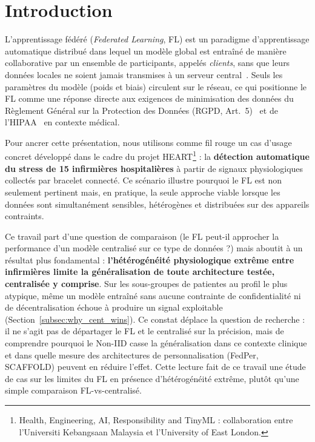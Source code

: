 \documentclass{article}
\begin{document}

\maketitle

\section{Introduction}

L'apprentissage fédéré (\textit{Federated Learning}, FL) est un paradigme
d'apprentissage automatique distribué dans lequel un modèle global est entraîné de
manière collaborative par un ensemble de participants, appelés \textit{clients}, sans
que leurs données locales ne soient jamais transmises à un serveur
central~\cite{mcmahan2017communication}. Seuls les paramètres du modèle (poids et
biais) circulent sur le réseau, ce qui positionne le FL comme une réponse directe aux
exigences de minimisation des données du Règlement Général sur la Protection des
Données (RGPD, Art.~5)~\cite{gdpr2016} et de l'HIPAA~\cite{hipaa1996} en contexte
médical.

Pour ancrer cette présentation, nous utilisons comme fil rouge un cas d'usage concret
développé dans le cadre du projet HEART\footnote{Health, Engineering, AI,
Responsibility and TinyML : collaboration entre l'Universiti Kebangsaan Malaysia et
l'University of East London.} : la \textbf{détection automatique du stress de
15 infirmières hospitalières} à partir de signaux physiologiques collectés par bracelet
connecté. Ce scénario illustre pourquoi le FL est non seulement pertinent mais, en
pratique, la seule approche viable lorsque les données sont simultanément sensibles,
hétérogènes et distribuées sur des appareils contraints.

Ce travail part d'une question de comparaison (le FL peut-il approcher la performance
d'un modèle centralisé sur ce type de données ?) mais aboutit à un résultat plus
fondamental : \textbf{l'hétérogénéité physiologique extrême entre infirmières limite la
généralisation de toute architecture testée, centralisée y comprise}. Sur les
sous-groupes de patientes au profil le plus atypique, même un modèle entraîné sans
aucune contrainte de confidentialité ni de décentralisation échoue à produire un signal
exploitable (Section~\ref{subsec:why_cent_wins}). Ce constat déplace la question de
recherche : il ne s'agit pas de départager le FL et le centralisé sur la précision, mais
de comprendre pourquoi le Non-IID casse la généralisation dans ce contexte clinique et
dans quelle mesure des architectures de personnalisation (FedPer, SCAFFOLD) peuvent en
réduire l'effet. Cette lecture fait de ce travail une étude de cas sur les limites
du FL en présence d'hétérogénéité extrême, plutôt qu'une simple comparaison
FL-vs-centralisé.
\end{document}
